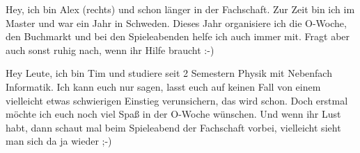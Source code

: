 \begin{multicols*}{2}
\small
{}
{%

Hey,
ich bin Alex (rechts) und schon länger in der Fachschaft.  
Zur Zeit bin ich im Master und war ein Jahr in Schweden.
Dieses Jahr organisiere ich  die O-Woche, den Buchmarkt und bei den Spieleabenden helfe ich auch immer mit.
Fragt aber auch sonst ruhig nach, wenn ihr Hilfe braucht :-)
}

{Hey Leute, ich bin Tim und studiere seit 2 Semestern Physik mit Nebenfach Informatik. Ich kann euch nur sagen, lasst euch auf keinen Fall von einem vielleicht etwas schwierigen Einstieg verunsichern, das wird schon. Doch erstmal möchte ich euch noch viel Spaß in der O-Woche wünschen. Und wenn ihr Lust habt, dann schaut mal beim Spieleabend der Fachschaft vorbei, vielleicht sieht man sich da ja wieder ;-)}


\end{multicols*}
